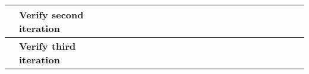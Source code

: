 \begin{table}[ht!]
\begin{tabular}{lp{2.5in}|llllllllllllllllllll|}
    \multicolumn{1}{|l|}{\cellcolor[HTML]{00E2FF}\textbf{}}                & \cellcolor[HTML]{00E2FF}\textbf{Verify second iteration}                   & \multicolumn{1}{l|}{}                                   & \multicolumn{1}{l|}{}                                   & \multicolumn{1}{l|}{}                                   & \multicolumn{1}{l|}{}                                   & \multicolumn{1}{l|}{}                                   & \multicolumn{1}{l|}{}                                   & \multicolumn{1}{l|}{}                                   & \multicolumn{1}{l|}{}                                   & \multicolumn{1}{l|}{}                                   & \multicolumn{1}{l|}{}                                    & \multicolumn{1}{l|}{\cellcolor[HTML]{F8A102}}            & \multicolumn{1}{l|}{}                                    & \multicolumn{1}{l|}{}                                    & \multicolumn{1}{l|}{}                                    & \multicolumn{1}{l|}{}                                    & \multicolumn{1}{l|}{}                                    & \multicolumn{1}{l|}{}                                    & \multicolumn{1}{l|}{}                                    & \multicolumn{1}{l|}{}                                    &             \\ \hline
    \multicolumn{1}{|l|}{\cellcolor[HTML]{00E2FF}\textbf{}}                & \cellcolor[HTML]{00E2FF}\textbf{Verify third iteration}                    & \multicolumn{1}{l|}{}                                   & \multicolumn{1}{l|}{}                                   & \multicolumn{1}{l|}{}                                   & \multicolumn{1}{l|}{}                                   & \multicolumn{1}{l|}{}                                   & \multicolumn{1}{l|}{}                                   & \multicolumn{1}{l|}{}                                   & \multicolumn{1}{l|}{}                                   & \multicolumn{1}{l|}{}                                   & \multicolumn{1}{l|}{}                                    & \multicolumn{1}{l|}{}                                    & \multicolumn{1}{l|}{}                                    & \multicolumn{1}{l|}{}                                    & \multicolumn{1}{l|}{\cellcolor[HTML]{F8A102}}            & \multicolumn{1}{l|}{}                                    & \multicolumn{1}{l|}{}                                    & \multicolumn{1}{l|}{}                                    & \multicolumn{1}{l|}{}                                    & \multicolumn{1}{l|}{}                                    &             \\ \hline

\end{tabular}
\end{table}
